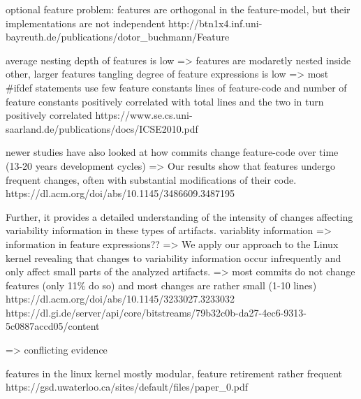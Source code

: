 optional feature problem: features are orthogonal in the feature-model, but their implementations are not independent
http://btn1x4.inf.uni-bayreuth.de/publications/dotor_buchmann/Feature%

average nesting depth of features is low => features are modaretly nested inside other, larger features
tangling degree of feature expressions is low => most #ifdef statements use few feature constants
lines of feature-code and number of feature constants positively correlated with total lines and the two in turn positively correlated
https://www.se.cs.uni-saarland.de/publications/docs/ICSE2010.pdf

newer studies have also looked at how commits change feature-code over time (13-20 years development cycles)
=> Our results show that features undergo frequent changes, often with substantial modifications of their code. 
https://dl.acm.org/doi/abs/10.1145/3486609.3487195

Further, it provides a detailed understanding of the intensity of changes affecting variability information in these types of artifacts. 
variablity information => information in feature expressions??
=> We apply our approach to the Linux kernel revealing that changes to variability information occur infrequently and only affect small parts of the analyzed artifacts.
=> most commits do not change features (only 11\% do so) and most changes are rather small (1-10 lines)
https://dl.acm.org/doi/abs/10.1145/3233027.3233032
https://dl.gi.de/server/api/core/bitstreams/79b32c0b-da27-4ec6-9313-5c0887accd05/content

=> conflicting evidence

features in the linux kernel mostly modular, feature retirement rather frequent
https://gsd.uwaterloo.ca/sites/default/files/paper_0.pdf

\fi
